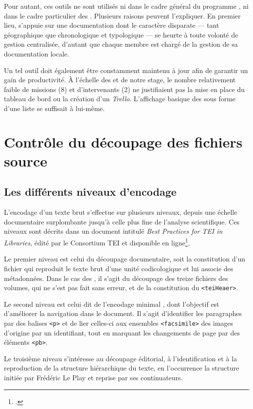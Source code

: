 Pour autant, ces outils ne sont utilisés ni dans le cadre général du programme \timeus, ni dans le cadre particulier des \odm. Plusieurs raisons peuvent l'expliquer. En premier lieu, \timeus{} s'appuie sur une documentation dont le caractère disparate --- tant géographique que chronologique et typologique --- se heurte à toute volonté de gestion centralisée, d'autant que chaque membre est chargé de la gestion de sa documentation locale.

Un tel outil doit également être constamment maintenu à jour afin de garantir un gain de productivité. À l'échelle des \odm{} et de notre stage, le nombre relativement faible de missions (8) et d'intervenants (2) ne justifiaient pas la mise en place du tableau de bord \gitlab{} ou la création d'un \textit{Trello}. L'affichage basique des \issues{} sous forme d'une liste se suffisait à lui-même.

\chapter{Contrôle du découpage des fichiers source}

\section{Les différents niveaux d'encodage}

L'encodage d'un texte brut s'effectue sur plusieurs niveaux, depuis une échelle documentaire surplombante jusqu'à celle plus fine de l'analyse scientifique. Ces niveaux sont décrits dans un document intitulé \textit{Best Practices for TEI in Libraries}, édité par le Consortium TEI et disponible en ligne\footcite[\textit{4.2. Encoding Levels}]{bestpratice}.

Le premier niveau est celui du découpage documentaire, soit la constitution d'un fichier qui reproduit le texte brut d'une unité codicologique et lui associe des métadonnées. Dans le cas des \odm, il s'agit du découpage des treize fichiers des volumes, qui ne s'est pas fait sans erreur, et de la constitution du \texttt{<teiHeaer>}.

Le second niveau est celui dit de l'encodage \og minimal \fg, dont l'objectif est d'améliorer la navigation dans le document. Il s'agit d'identifier les paragraphes par des balises \texttt{<p>} et de lier celles-ci aux ensembles \texttt{<facsimile>} des images d'origine par un identifiant, tout en marquant les changements de page par des éléments \texttt{<pb>}.

Le troisième niveau s'intéresse au découpage éditorial, \cad{} à l'identification et à la reproduction de la structure hiérarchique du texte, en l'occurrence la structure initiée par Frédéric Le Play et reprise par ses continuateurs.

